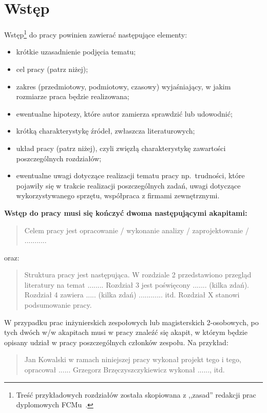 \chapter{Wstęp}

Wstęp\footnote{Treść przykładowych rozdziałów została skopiowana
z ,,zasad'' redakcji prac dyplomowych FCMu~\cite{fcm-red}.} do pracy powinien zawierać następujące elementy:
\begin{itemize}
    \item krótkie uzasadnienie podjęcia tematu;
    \item cel pracy (patrz niżej);
    \item zakres (przedmiotowy, podmiotowy, czasowy) wyjaśniający, w jakim rozmiarze praca będzie realizowana;
    \item ewentualne hipotezy, które autor zamierza sprawdzić lub udowodnić;
    \item krótką charakterystykę źródeł, zwłaszcza literaturowych;
    \item układ pracy (patrz niżej), czyli zwięzłą charakterystykę zawartości poszczególnych rozdziałów;
    \item ewentualne uwagi dotyczące realizacji tematu pracy np.~trudności, które pojawiły się w trakcie
    realizacji poszczególnych zadań, uwagi dotyczące wykorzystywanego sprzętu, współpraca z firmami zewnętrznymi.
\end{itemize}

\noindent
\textbf{Wstęp do pracy musi się kończyć dwoma następującymi akapitami:}
\begin{quote}
    Celem pracy jest opracowanie / wykonanie analizy / zaprojektowanie / ...........
\end{quote}
oraz:
\begin{quote}
    Struktura pracy jest następująca. W rozdziale 2 przedstawiono przegląd literatury na temat ........
    Rozdział 3 jest poświęcony ....... (kilka zdań).
    Rozdział 4 zawiera ..... (kilka zdań) ............ itd.
    Rozdział X stanowi podsumowanie pracy.
\end{quote}

W przypadku prac inżynierskich zespołowych lub magisterskich 2-osobowych, po tych dwóch w/w akapitach
musi w pracy znaleźć się akapit, w którym będzie opisany udział w pracy poszczególnych członków zespołu. Na przykład:

\begin{quote}
    Jan Kowalski w ramach niniejszej pracy wykonał projekt tego i tego, opracował ......
    Grzegorz Brzęczyszczykiewicz wykonał ......, itd.
\end{quote}

